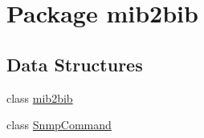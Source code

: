\hypertarget{namespacemib2bib}{}\section{Package mib2bib}
\label{namespacemib2bib}
\subsection*{Data Structures}
\begin{DoxyCompactItemize}
\item 
class \hyperlink{classmib2bib_1_1mib2bib}{mib2bib}
\item 
class \hyperlink{classmib2bib_1_1_snmp_command}{Snmp\+Command}
\end{DoxyCompactItemize}
